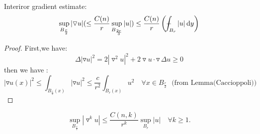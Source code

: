 Interiror gradient estimate:
\begin{equation*}
    \sup_{B_{\frac{r}{2}}}|\triangledown u|(\leq \frac{C(n)}{r}\sup_{B_{\frac{2r}{3}}}|u|)\leq \frac{C(n)}{r}\left(\dashint_{B_r}|u|\,\dd y \right)
\end{equation*}

\begin{proof}
    First,we have:
    \begin{equation*}
        \Delta |\triangledown u|^2=2|\triangledown^2 u|^2+2\triangledown u\cdot \triangledown \,\Delta u\geq 0
    \end{equation*}
    then we have :
    \begin{equation*}
        |\triangledown u(x)|^2\leq \int_{B_{\frac{r}{2}}(x)}|\triangledown u|^2\leq \frac{c}{r^2}\int_{B_r(x)}u^2\quad \forall x\in B_{\frac{r}{2}}\,\,\,\,\text{(from Lemma(Caccioppoli))}
    \end{equation*}
\end{proof}

\begin{equation*}
    \sup_{B_{\frac{r}{2}}}|\triangledown^k u|\leq \frac{C(n,k)}{r^k} \sup_{B_r}|u| \quad \forall k\geq 1.
\end{equation*}

